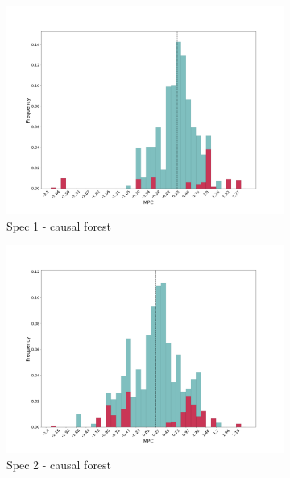 \begin{figure}[t]
    \begin{subfigure}{0.33\linewidth}
        \includegraphics[width=\linewidth]{figures/distributions/spec1_cf_chNDexp.png}
        \caption{Spec 1 - causal forest }
    \end{subfigure}\hfill
    \begin{subfigure}{0.33\linewidth}
        \includegraphics[width=\linewidth]{figures/distributions/spec2_cf_chNDexp.png}
        \caption{Spec 2 - causal forest }
    \end{subfigure}\hfill
    \begin{subfigure}{0.33\linewidth}

\end{subfigure}
\end{figure}
